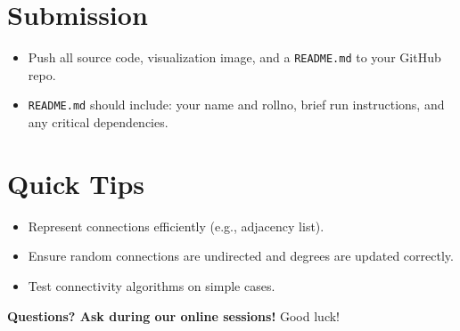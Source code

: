 \documentclass[12pt]{extarticle}
\begin{document}
\section*{Submission}
\begin{itemize}
    \item Push all source code, visualization image, and a \texttt{README.md} to your GitHub repo.
    \item \texttt{README.md} should include: your name and rollno, brief run instructions, and any critical dependencies.
\end{itemize}

\section*{Quick Tips}
\begin{itemize}
    \item Represent connections efficiently (e.g., adjacency list).
    \item Ensure random connections are undirected and degrees are updated correctly.
    \item Test connectivity algorithms on simple cases.
\end{itemize}

\textbf{Questions? Ask during our online sessions!} Good luck! \faThumbsOUp
\end{document}

